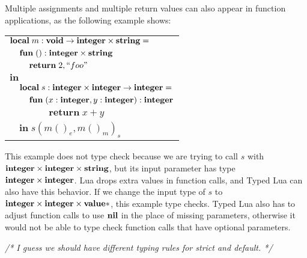Multiple assignments and multiple return values can also appear in
function applications, as the following example shows:
\begin{center}
\begin{tabular}{llll}
\multicolumn{4}{l}{$\mathbf{local} \; m:\mathbf{void} \rightarrow \mathbf{integer} \times \mathbf{string} =$} \\
& \multicolumn{3}{l}{$\mathbf{fun} \; ():\mathbf{integer} \times \mathbf{string}$} \\
& & \multicolumn{2}{l}{$\mathbf{return} \; 2, ``foo"$} \\
\multicolumn{4}{l}{$\mathbf{in}$} \\
& \multicolumn{3}{l}{$\mathbf{local} \; s:\mathbf{integer} \times \mathbf{integer} \rightarrow \mathbf{integer} =$} \\
& & \multicolumn{2}{l}{$\mathbf{fun} \; (x:\mathbf{integer}, y:\mathbf{integer}):\mathbf{integer}$} \\
& & & \multicolumn{1}{l}{$\mathbf{return} \; x + y$} \\
& \multicolumn{3}{l}{$\mathbf{in} \; s(m()_{e}, m()_{m})_{s}$}
\end{tabular}
\end{center}

This example does not type check because we are trying to call
$s$ with $\mathbf{integer} \times \mathbf{integer} \times \mathbf{string}$,
but its input parameter has type $\mathbf{integer} \times \mathbf{integer}$.
Lua drops extra values in function calls, and Typed Lua can also
have this behavior.
If we change the input type of $s$ to $\mathbf{integer} \times \mathbf{integer} \times \mathbf{value}{*}$,
this example type checks.
Typed Lua also has to adjust function calls to use $\mathbf{nil}$ in the
place of missing parameters, otherwise it would not be able to
type check function calls that have optional parameters.

\textit{/* I guess we should have different typing rules for strict and default. */}

